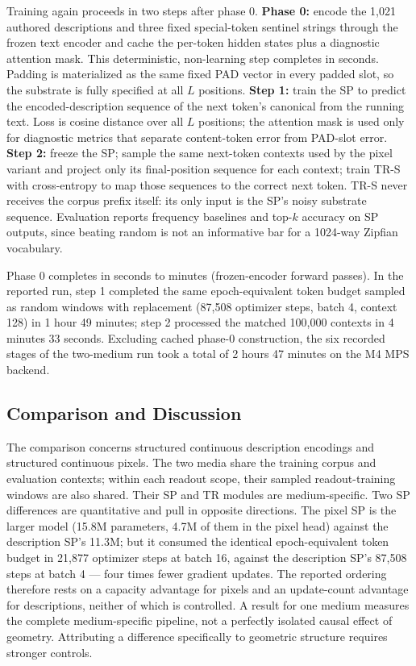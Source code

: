 \documentclass[11pt,a4paper]{article}
\begin{document}
Training again proceeds in two steps after phase 0. \textbf{Phase 0:} encode the 1,021 authored descriptions and three fixed special-token sentinel strings through the frozen text encoder and cache the per-token hidden states plus a diagnostic attention mask. This deterministic, non-learning step completes in seconds. Padding is materialized as the same fixed PAD vector in every padded slot, so the substrate is fully specified at all $L$ positions. \textbf{Step 1:} train the SP to predict the encoded-description sequence of the next token's canonical from the running text. Loss is cosine distance over all $L$ positions; the attention mask is used only for diagnostic metrics that separate content-token error from PAD-slot error. \textbf{Step 2:} freeze the SP; sample the same next-token contexts used by the pixel variant and project only its final-position sequence for each context; train TR-S with cross-entropy to map those sequences to the correct next token. TR-S never receives the corpus prefix itself: its only input is the SP's noisy substrate sequence. Evaluation reports frequency baselines and top-$k$ accuracy on SP outputs, since beating random is not an informative bar for a 1024-way Zipfian vocabulary.

Phase 0 completes in seconds to minutes (frozen-encoder forward passes). In the reported run, step 1 completed the same epoch-equivalent token budget sampled as random windows with replacement (87,508 optimizer steps, batch 4, context 128) in 1 hour 49 minutes; step 2 processed the matched 100,000 contexts in 4 minutes 33 seconds. Excluding cached phase-0 construction, the six recorded stages of the two-medium run took a total of 2 hours 47 minutes on the M4 MPS backend.

\subsection{Comparison and Discussion}

The comparison concerns structured continuous description encodings and structured continuous pixels. The two media share the training corpus and evaluation contexts; within each readout scope, their sampled readout-training windows are also shared. Their SP and TR modules are medium-specific. Two SP differences are quantitative and pull in opposite directions. The pixel SP is the larger model (15.8M parameters, 4.7M of them in the pixel head) against the description SP's 11.3M; but it consumed the identical epoch-equivalent token budget in 21,877 optimizer steps at batch 16, against the description SP's 87,508 steps at batch 4 --- four times fewer gradient updates. The reported ordering therefore rests on a capacity advantage for pixels and an update-count advantage for descriptions, neither of which is controlled. A result for one medium measures the complete medium-specific pipeline, not a perfectly isolated causal effect of geometry. Attributing a difference specifically to geometric structure requires stronger controls.
\end{document}
